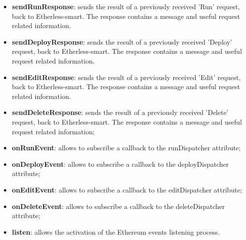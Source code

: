 	\begin{itemize}
		\item \textbf{sendRunResponse}: sends the result of a previously received 'Run' request, back to Etherless-smart. The response contains a message and useful request related information.
		\item \textbf{sendDeployResponse}: sends the result of a previously received 'Deploy' request, back to Etherless-smart. The response contains a message and useful request related information.
		\item \textbf{sendEditResponse}: sends the result of a previously received 'Edit' request, back to Etherless-smart. The response contains a message and useful request related information.
		\item \textbf{sendDeleteResponse}: sends the result of a previously received 'Delete' request, back to Etherless-smart. The response contains a message and useful request related information;
		\item \textbf{onRunEvent}: allows to subscribe a callback to the runDispatcher attribute;
		\item \textbf{onDeployEvent}: allows to subscribe a callback to the deployDispatcher attribute;
		\item \textbf{onEditEvent}: allows to subscribe a callback to the editDispatcher attribute;
		\item \textbf{onDeleteEvent}: allows to subscribe a callback to the deleteDispatcher attribute;
		\item \textbf{listen}: allows the activation of the Ethereum events listening process.
	\end{itemize}

